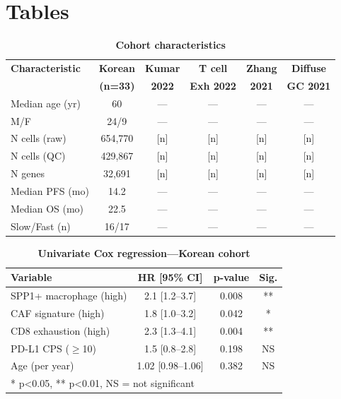 \documentclass[12pt,twoside]{article}
\begin{document}

\clearpage
\section*{Tables}

\begin{table}[H]
\centering
\caption{\textbf{Cohort characteristics}}
\label{tab:1}
\small
\begin{tabular}{l c c c c c}
\toprule
\textbf{Characteristic} & \textbf{Korean} & \textbf{Kumar} & \textbf{T cell} & \textbf{Zhang} & \textbf{Diffuse} \\
& \textbf{(n=33)} & \textbf{2022} & \textbf{Exh 2022} & \textbf{2021} & \textbf{GC 2021} \\
\midrule
Median age (yr) & 60 & — & — & — & — \\
M/F & 24/9 & — & — & — & — \\
N cells (raw) & 654,770 & [n] & [n] & [n] & [n] \\
N cells (QC) & 429,867 & [n] & [n] & [n] & [n] \\
N genes & 32,691 & [n] & [n] & [n] & [n] \\
Median PFS (mo) & 14.2 & — & — & — & — \\
Median OS (mo) & 22.5 & — & — & — & — \\
Slow/Fast (n) & 16/17 & — & — & — & — \\
\bottomrule
\end{tabular}
\end{table}

\begin{table}[H]
\centering
\caption{\textbf{Univariate Cox regression—Korean cohort}}
\label{tab:2}
\small
\begin{tabular}{l c c c}
\toprule
\textbf{Variable} & \textbf{HR [95\% CI]} & \textbf{p-value} & \textbf{Sig.} \\
\midrule
SPP1+ macrophage (high) & 2.1 [1.2--3.7] & 0.008 & ** \\
CAF signature (high) & 1.8 [1.0--3.2] & 0.042 & * \\
CD8 exhaustion (high) & 2.3 [1.3--4.1] & 0.004 & ** \\
PD-L1 CPS ($\geq$10) & 1.5 [0.8--2.8] & 0.198 & NS \\
Age (per year) & 1.02 [0.98--1.06] & 0.382 & NS \\
\bottomrule
\multicolumn{4}{l}{* p<0.05, ** p<0.01, NS = not significant} \\
\end{tabular}
\end{table}
\end{document}
